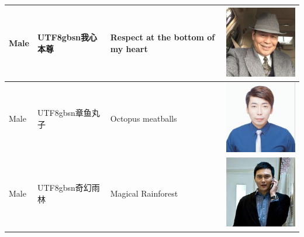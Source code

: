 \documentclass[11pt]{article}
\newcommand{\zh}[1]{\begin{CJK*}{UTF8}{gbsn}#1\end{CJK*}}
\begin{document}
\begin{table}[H]
\begin{tabular}{|p{}|p{}|p{}|p{}|}
	Male & \zh{我心本尊} & Respect at the bottom of my heart & \begin{minipage}{.2\textwidth}\includegraphics[width=.45\linewidth, height=.45\linewidth]{figures/ordinary_avatars/m1.jpg}\end{minipage} \\ \hline
	Male & \zh{章鱼丸子} & Octopus meatballs & \begin{minipage}{.2\textwidth}\includegraphics[width=.45\linewidth, height=.45\linewidth]{figures/ordinary_avatars/m2.jpg}\end{minipage} \\ \hline
	Male & \zh{奇幻雨林} & Magical Rainforest & \begin{minipage}{.2\textwidth}\includegraphics[width=.45\linewidth, height=.45\linewidth]{figures/ordinary_avatars/m3.jpg}\end{minipage} \\ \hline

\end{tabular}
\end{table}
\end{document}
